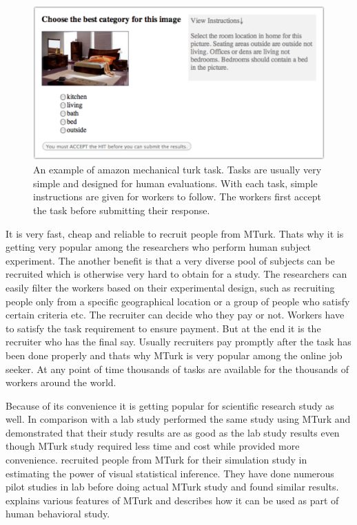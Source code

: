 \documentclass[11pt]{article}
\begin{document}
\begin{figure}[htbp] 
   \centering
   \includegraphics[width=5in]{amazon_task.pdf} 
   \caption{An example of amazon mechanical turk task. Tasks are usually very simple and designed for human evaluations. With each task, simple instructions are given for workers to follow. The workers first accept the task before submitting their response.}
   \label{fig:amazon_task}
\end{figure}






It is very fast, cheap and reliable to recruit people from MTurk. Thats why it is getting very popular among the researchers who perform human subject experiment. The another benefit is that a very diverse pool of subjects can be recruited which is otherwise very hard to obtain for a study. The researchers can easily filter the workers based on their experimental design, such as recruiting people only from a specific geographical location or a group of people who satisfy certain criteria etc. The recruiter can decide who they pay or not. Workers have to satisfy the task requirement to ensure payment. But at the end it is the recruiter who has the final say. Usually recruiters pay promptly after the task has been done properly and thats why MTurk is very popular among the online job seeker. At any point of time thousands of tasks are available for the thousands of workers around the world. 

Because of its convenience it is getting popular for scientific research study as well. In comparison with a lab study \cite{suri:2010} performed the same study using MTurk and demonstrated that their study results are as good as the lab study results even though MTurk study required less time and cost while provided more convenience. \cite{majumder:2013} recruited people from MTurk for their simulation study in estimating the power of visual statistical inference. They have done numerous pilot studies in lab before doing actual MTurk study and found similar results. \cite{mason:2012} explains various features of MTurk and describes how it can be used as part of human behavioral study.
\end{document}
